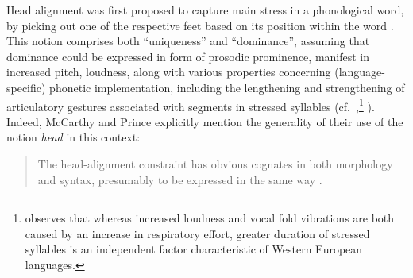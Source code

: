 \documentclass[output=paper
 ,nobabel
 ,draftmode
 ,colorlinks, citecolor=brown
]{langscibook}
\begin{document}
Head alignment was first proposed to capture main stress in a phonological word, by picking out one of the respective feet based on its position within the word \citep[98]{McCarthyPrince1993}. This notion comprises both ``uniqueness'' and ``dominance'', assuming that dominance could be expressed in form of prosodic prominence, manifest in increased pitch, loudness, along with various properties concerning (language-specific) phonetic implementation, including the lengthening and strengthening of articulatory gestures associated with segments in stressed syllables (cf.\ \citealp[125]{Lehiste1970},\footnote{\citet*[125]{Lehiste1970} observes that whereas increased loudness and vocal fold vibrations are both caused by an increase in respiratory effort, greater duration of stressed syllables is an independent factor characteristic of Western European 
languages.} \citealp[90]{Ladefoged2003}). Indeed, McCarthy and Prince explicitly mention the generality of their use of the  notion \emph{head} in this context:

\begin{quote}
    The head-alignment constraint has obvious cognates in both morphology and syntax, presumably to be expressed in the same way \citep[99]{McCarthyPrince1993}.
\end{quote}
\end{document}
